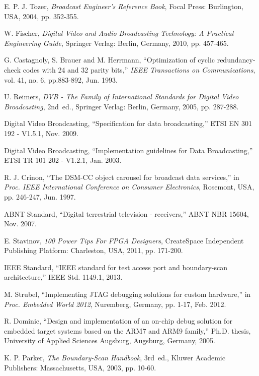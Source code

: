 \begin{thebibliography}{}
E. P. J. Tozer, {\it Broadcast Engineer's Reference Book}, Focal Press: Burlington, USA, 2004, pp. 352-355.
	
W. Fischer, {\it Digital Video and Audio Broadcasting Technology: A Practical Engineering Guide}, Springer Verlag: Berlin, Germany, 2010, pp. 457-465.
	
G. Castagnoly, S. Brauer and M. Herrmann, ``Optimization of cyclic redundancy-check codes with 24 and 32 parity bits,'' \emph{IEEE Transactions on Communications}, vol. 41, no. 6, pp.883-892, Jun. 1993.

U. Reimers, {\it DVB - The Family of International Standards for Digital Video Broadcasting}, 2nd~ed., Springer Verlag: Berlin, Germany, 2005, pp. 287-288.
	
Digital Video Broadcasting, ``Specification for data broadcasting,'' ETSI EN 301 192 - V1.5.1, Nov. 2009.

Digital Video Broadcasting, ``Implementation guidelines for Data Broadcasting,'' ETSI TR 101 202 - V1.2.1, Jan. 2003.

R. J. Crinon, ``The DSM-CC object carousel for broadcast data services,'' in \emph{Proc. IEEE International Conference on Consumer Electronics}, Rosemont, USA, pp. 246-247, Jun. 1997.

ABNT Standard, ``Digital terrestrial television - receivers,'' ABNT NBR 15604, Nov. 2007.
	
E. Stavinov, {\it 100 Power Tips For FPGA Designers}, CreateSpace Independent Publishing Platform: Charleston, USA, 2011, pp. 171-200.
	
IEEE Standard, ``IEEE standard for test access port and boundary-scan architecture,'' IEEE Std. 1149.1, 2013.
	
M. Strubel, ``Implementing JTAG debugging solutions for custom hardware,'' in \emph{Proc. Embedded World 2012}, Nuremberg, Germany, pp. 1-17, Feb. 2012.
		
R. Dominic, ``Design and implementation of an on-chip debug solution for embedded target systems based on the ARM7 and ARM9 family,'' Ph.D. thesis, University of Applied Sciences Augsburg, Augsburg, Germany, 2005.
		
K. P. Parker, {\it The Boundary-Scan Handbook}, 3rd~ed., Kluwer Academic Publishers: Massachusetts, USA, 2003, pp. 10-60.


\end{thebibliography}
